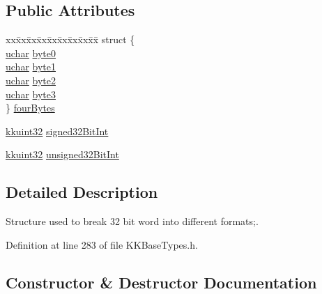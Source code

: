 \subsection*{Public Attributes}
\begin{DoxyCompactItemize}
\item 
\begin{tabbing}
xx\=xx\=xx\=xx\=xx\=xx\=xx\=xx\=xx\=\kill
struct \{\\
\>\hyperlink{namespace_k_k_b_ace9969169bf514f9ee6185186949cdf7}{uchar} \hyperlink{union_k_k_b_1_1_word_format32_bits_a7172ef166d47f672768eaf94666ec5cd}{byte0}\\
\>\hyperlink{namespace_k_k_b_ace9969169bf514f9ee6185186949cdf7}{uchar} \hyperlink{union_k_k_b_1_1_word_format32_bits_a3a4cec5553f28a1010a3a1bb6f182f3f}{byte1}\\
\>\hyperlink{namespace_k_k_b_ace9969169bf514f9ee6185186949cdf7}{uchar} \hyperlink{union_k_k_b_1_1_word_format32_bits_a7dce1e987826e201b31d75d3050359ba}{byte2}\\
\>\hyperlink{namespace_k_k_b_ace9969169bf514f9ee6185186949cdf7}{uchar} \hyperlink{union_k_k_b_1_1_word_format32_bits_aa833400f553206f88aae886076886fe8}{byte3}\\
\} \hyperlink{union_k_k_b_1_1_word_format32_bits_a377fc22bfc20aaa559f6572b55663069}{fourBytes}\\

\end{tabbing}\item 
\hyperlink{namespace_k_k_b_af8d832f05c54994a1cce25bd5743e19a}{kkuint32} \hyperlink{union_k_k_b_1_1_word_format32_bits_a0f0a2e9b5926c499ded704deff7297b5}{signed32\+Bit\+Int}
\item 
\hyperlink{namespace_k_k_b_af8d832f05c54994a1cce25bd5743e19a}{kkuint32} \hyperlink{union_k_k_b_1_1_word_format32_bits_ac0c992b584e5b3549cd2c0e8528c9b74}{unsigned32\+Bit\+Int}
\end{DoxyCompactItemize}


\subsection{Detailed Description}
Structure used to break 32 bit word into different formats;. 

Definition at line 283 of file K\+K\+Base\+Types.\+h.



\subsection{Constructor \& Destructor Documentation}
